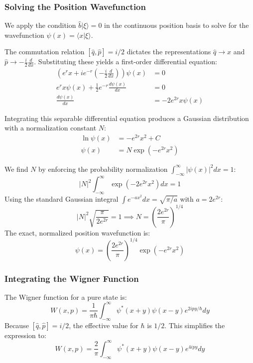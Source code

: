 {\subsubsection{Solving the Position Wavefunction}
We apply the condition $\hat{b}|\xi\rangle = 0$ in the continuous position basis to solve for the wavefunction $\psi(x) = \langle x | \xi \rangle$. 

The commutation relation $[\hat{q}, \hat{p}] = i/2$ dictates the representations $\hat{q} \to x$ and $\hat{p} \to -\frac{i}{2}\frac{d}{dx}$. Substituting these yields a first-order differential equation:
\begin{align*}
\left( e^{r} x + i e^{-r} \left( -\frac{i}{2}\frac{d}{dx} \right) \right) \psi(x) &= 0 \\
e^{r} x \psi(x) + \frac{1}{2} e^{-r} \frac{d\psi(x)}{dx} &= 0 \\
\frac{d\psi(x)}{dx} &= -2 e^{2r} x \psi(x)
\end{align*}

Integrating this separable differential equation produces a Gaussian distribution with a normalization constant $N$:
\begin{align*}
\ln \psi(x) &= -e^{2r} x^2 + C \\
\psi(x) &= N \exp\left(-e^{2r} x^2\right)
\end{align*}

We find $N$ by enforcing the probability normalization $\int_{-\infty}^{\infty} |\psi(x)|^2 dx = 1$:
\begin{equation*}
|N|^2 \int_{-\infty}^{\infty} \exp\left(-2e^{2r} x^2\right) dx = 1
\end{equation*}
Using the standard Gaussian integral $\int e^{-ax^2} dx = \sqrt{\pi/a}$ with $a = 2e^{2r}$:
\begin{equation*}
|N|^2 \sqrt{\frac{\pi}{2e^{2r}}} = 1 \implies N = \left( \frac{2e^{2r}}{\pi} \right)^{1/4}
\end{equation*}
The exact, normalized position wavefunction is:
\begin{equation*}
\psi(x) = \left( \frac{2e^{2r}}{\pi} \right)^{1/4} \exp\left(-e^{2r} x^2\right)
\end{equation*}

\subsubsection{Integrating the Wigner Function}
The Wigner function for a pure state is:
\begin{equation*}
W(x,p) = \frac{1}{\pi\hbar} \int_{-\infty}^{\infty} \psi^*(x+y)\psi(x-y) e^{2ipy/\hbar} dy
\end{equation*}
Because $[\hat{q}, \hat{p}] = i/2$, the effective value for $\hbar$ is $1/2$. This simplifies the expression to:
\begin{equation*}
W(x,p) = \frac{2}{\pi} \int_{-\infty}^{\infty} \psi^*(x+y)\psi(x-y) e^{4ipy} dy
\end{equation*}

}
